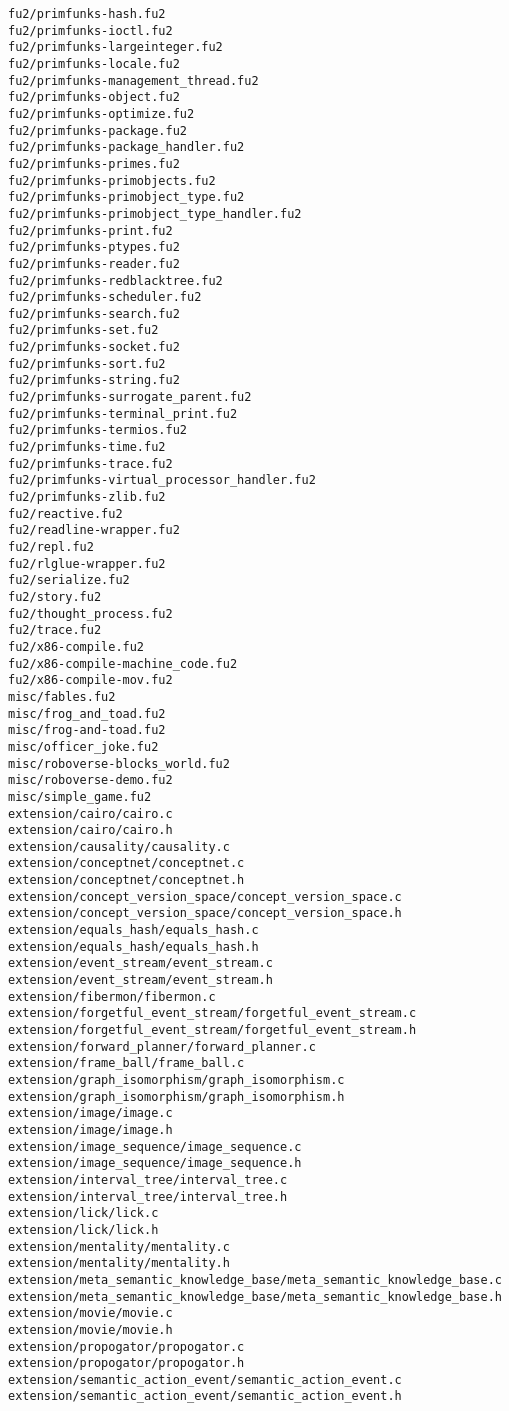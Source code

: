 \begin{lstlisting}
fu2/primfunks-hash.fu2
fu2/primfunks-ioctl.fu2
fu2/primfunks-largeinteger.fu2
fu2/primfunks-locale.fu2
fu2/primfunks-management_thread.fu2
fu2/primfunks-object.fu2
fu2/primfunks-optimize.fu2
fu2/primfunks-package.fu2
fu2/primfunks-package_handler.fu2
fu2/primfunks-primes.fu2
fu2/primfunks-primobjects.fu2
fu2/primfunks-primobject_type.fu2
fu2/primfunks-primobject_type_handler.fu2
fu2/primfunks-print.fu2
fu2/primfunks-ptypes.fu2
fu2/primfunks-reader.fu2
fu2/primfunks-redblacktree.fu2
fu2/primfunks-scheduler.fu2
fu2/primfunks-search.fu2
fu2/primfunks-set.fu2
fu2/primfunks-socket.fu2
fu2/primfunks-sort.fu2
fu2/primfunks-string.fu2
fu2/primfunks-surrogate_parent.fu2
fu2/primfunks-terminal_print.fu2
fu2/primfunks-termios.fu2
fu2/primfunks-time.fu2
fu2/primfunks-trace.fu2
fu2/primfunks-virtual_processor_handler.fu2
fu2/primfunks-zlib.fu2
fu2/reactive.fu2
fu2/readline-wrapper.fu2
fu2/repl.fu2
fu2/rlglue-wrapper.fu2
fu2/serialize.fu2
fu2/story.fu2
fu2/thought_process.fu2
fu2/trace.fu2
fu2/x86-compile.fu2
fu2/x86-compile-machine_code.fu2
fu2/x86-compile-mov.fu2
misc/fables.fu2
misc/frog_and_toad.fu2
misc/frog-and-toad.fu2
misc/officer_joke.fu2
misc/roboverse-blocks_world.fu2
misc/roboverse-demo.fu2
misc/simple_game.fu2
extension/cairo/cairo.c
extension/cairo/cairo.h
extension/causality/causality.c
extension/conceptnet/conceptnet.c
extension/conceptnet/conceptnet.h
extension/concept_version_space/concept_version_space.c
extension/concept_version_space/concept_version_space.h
extension/equals_hash/equals_hash.c
extension/equals_hash/equals_hash.h
extension/event_stream/event_stream.c
extension/event_stream/event_stream.h
extension/fibermon/fibermon.c
extension/forgetful_event_stream/forgetful_event_stream.c
extension/forgetful_event_stream/forgetful_event_stream.h
extension/forward_planner/forward_planner.c
extension/frame_ball/frame_ball.c
extension/graph_isomorphism/graph_isomorphism.c
extension/graph_isomorphism/graph_isomorphism.h
extension/image/image.c
extension/image/image.h
extension/image_sequence/image_sequence.c
extension/image_sequence/image_sequence.h
extension/interval_tree/interval_tree.c
extension/interval_tree/interval_tree.h
extension/lick/lick.c
extension/lick/lick.h
extension/mentality/mentality.c
extension/mentality/mentality.h
extension/meta_semantic_knowledge_base/meta_semantic_knowledge_base.c
extension/meta_semantic_knowledge_base/meta_semantic_knowledge_base.h
extension/movie/movie.c
extension/movie/movie.h
extension/propogator/propogator.c
extension/propogator/propogator.h
extension/semantic_action_event/semantic_action_event.c
extension/semantic_action_event/semantic_action_event.h

\end{lstlisting}
